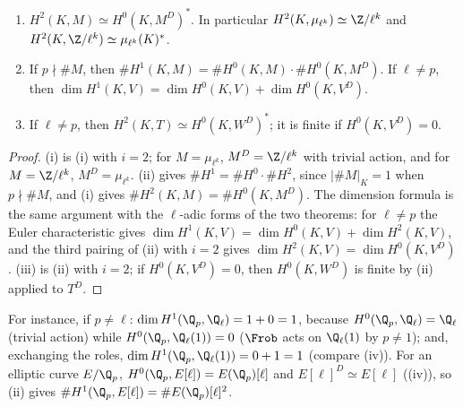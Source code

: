 \begin{corollary}\label{cor:galcoh:local-duality-consequences}
\begin{enumerate}[label=(\roman*)]
\item $H^2(K,M)\simeq H^0(K,M^D)^*$. In particular $H^2(K,\mu_{\ell^k})\simeq\Z/\ell^k$ and $H^2(K,\Z/\ell^k)\simeq\mu_{\ell^k}(K)^*$.
\item If $p\nmid\#M$, then $\#H^1(K,M)=\#H^0(K,M)\cdot\#H^0(K,M^D)$. If $\ell\ne p$, then $\dim H^1(K,V)=\dim H^0(K,V)+\dim H^0(K,V^D)$.
\item If $\ell\ne p$, then $H^2(K,T)\simeq H^0(K,W^D)^*$; it is finite if $H^0(K,V^D)=0$.
\end{enumerate}
\end{corollary}

\begin{proof}
(i) is (i) with $i=2$; for $M=\mu_{\ell^k}$, $M^D=\Z/\ell^k$ with trivial action, and for $M=\Z/\ell^k$, $M^D=\mu_{\ell^k}$. (ii)
 gives $\#H^1=\#H^0\cdot\#H^2$, since $|\#M|_K=1$ when $p\nmid\#M$, and (i) gives $\#H^2(K,M)=\#H^0(K,M^D)$. The dimension formula is
the same argument with the $\ell$-adic forms of the two theorems: for $\ell\ne p$ the Euler characteristic gives $\dim H^1(K,V)=\dim H^0(K,V)+\dim H^2(K,V)$, and the
third pairing of (ii) with $i=2$ gives $\dim H^2(K,V)=\dim H^0(K,V^D)$. (iii) is (ii) with $i=2$; if $H^0(K,V^D)=0$, then $H^0(K,W^D)$ is finite by (ii)
applied to $T^D$.
\end{proof}

\noindent For instance, if $p\ne\ell$: $\dim H^1(\Q_p,\Q_\ell)=1+0=1$, because $H^0(\Q_p,\Q_\ell)=\Q_\ell$ (trivial action) while $H^0(\Q_p,\Q_\ell(1))=0$ ($\Frob$ acts on $\Q_\ell(1)$
by $p\ne1$); and, exchanging the roles, $\dim H^1(\Q_p,\Q_\ell(1))=0+1=1$ (compare (iv)). For an elliptic curve $E/\Q_p$,
$H^0(\Q_p,E[\ell])=E(\Q_p)[\ell]$ and $E[\ell]^D\simeq E[\ell]$ ((iv)), so (ii) gives $\#H^1(\Q_p,E[\ell])=\#E(\Q_p)[\ell]^2$.

